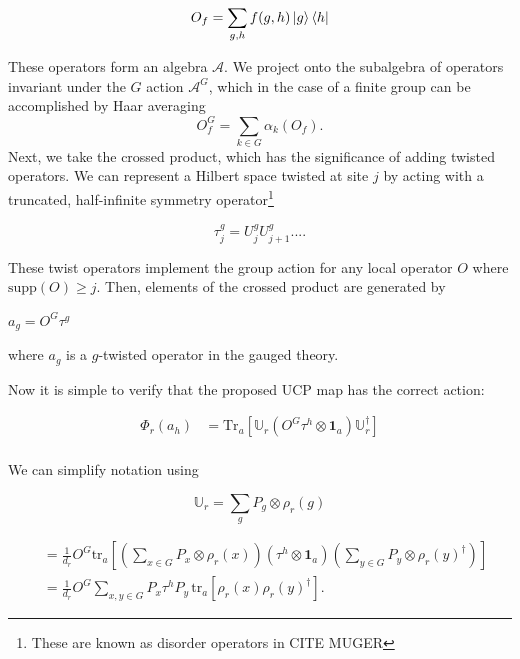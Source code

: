 \documentclass{article}
\newcommand{\Tr}{\mathrm{tr}}
\newcommand{\mA}{\mathcal{A}}
\theoremstyle{definition}
\begin{document}
\begin{equation}
    O_f = \sum_{g,h}f(g,h)\ket{g}\bra{h}
\end{equation}

These operators form an algebra $\mA$.  We project onto the subalgebra of operators invariant under the $G$ action $\mA^G$, which in the case of a finite group can be accomplished by Haar averaging \[O^G_f = \sum_{k\in G} \alpha_k(O_f). \]  Next, we take the crossed product, which has the significance of adding twisted operators.  We can represent a Hilbert space twisted at site $j$ by acting with a truncated, half-infinite symmetry operator\footnote{These are known as disorder operators in \color{brown}CITE MUGER\color{black}}

\begin{equation}
    \tau_j^g =U^g_jU^g_{j+1}....
\end{equation}

These twist operators implement the group action for any local operator $O$ where $\text{supp}(O) \geq j$. Then, elements of the crossed product are generated by 

$a_g = O^G\tau^g $

where $a_g$ is a $g$-twisted operator in the gauged theory.

Now it is simple to verify that the proposed UCP map has the correct action:


\begin{align}
        \Phi_r(a_h) &= 
    \text{Tr}_{a}
    \left[
        \mathbb{U}_r
        (O^G\tau^h\otimes \mathbf{1}_{a})
        \mathbb{U}_r^\dagger
    \right]\\
\end{align}

We can simplify notation using

\begin{equation}
    \mathbb{U}_r = \sum_g P_g \otimes \rho_r(g)
\end{equation}

\begin{align}
    &=
    \frac{1}{d_r}
    O^G
    \Tr_a
    \left[
        \left(
            \sum_{x\in G}P_x\otimes \rho_r(x)
        \right)
        (\tau^h\otimes \mathbf{1}_{a})
        \left(
            \sum_{y\in G}P_y\otimes \rho_r(y)^\dagger
        \right)
    \right] \\
    &=
    \frac{1}{d_r}
    O^G
    \sum_{x,y\in G}
    P_x\tau^h P_y\,
    \Tr_a\!\left[
        \rho_r(x)\rho_r(y)^\dagger
    \right].
\end{align}
\end{document}
